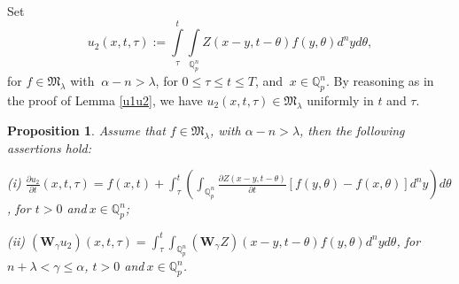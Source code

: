\documentclass{amsart}\usepackage{amsfonts}
\theoremstyle{plain}
\newtheorem{proposition}[theorem]{Proposition}
\numberwithin{equation}{section}
\begin{document}
Set
\[
u_{2}(x,t,\tau):={\displaystyle\int\limits_{\tau}^{t}}
\underset{\mathbb{Q}_{p}^{n}}{\int}Z(x-y,t-\theta)f(y,\theta)d^{n}yd\theta,
\]
for $f\in\mathcal{\mathfrak{M}}_{\lambda}$ with $\ \alpha-n>\lambda$, for
$0\leq\tau\leq t\leq T$, and $\ x\in\mathbb{Q}_{p}^{n}$. By reasoning as in
the proof of Lemma \ref{u1u2}, we have $u_{2}(x,t,\tau)\in
\mathcal{\mathfrak{M}}_{\lambda}$ uniformly in $t$ and $\tau$.

\begin{proposition}
\label{u2}Assume that $f\in\mathcal{\mathfrak{M}}_{\lambda}$, with
$\alpha-n>\lambda$, then the following assertions hold:

(i) $\frac{\partial u_{2}}{\partial t}(x,t,\tau)=f(x,t)+{\textstyle\int\nolimits_{\tau}^{t}}
\left(
{\textstyle\int\nolimits_{\mathbb{Q}_{p}^{n}}}
\frac{\partial Z(x-y,t-\theta)}{\partial t}\left[  f(y,\theta)-f(x,\theta
)\right]  d^{n}y\right)  d\theta$, for $t>0$ and$\ x\in\mathbb{Q}_{p}^{n}$;

(ii) $(\mathbf{W}_{\gamma}u_{2})(x,t,\tau)={\textstyle\int\nolimits_{\tau}^{t}}
{\textstyle\int\nolimits_{\mathbb{Q}_{p}^{n}}}
(\mathbf{W}_{\gamma}Z)(x-y,t-\theta)f(y,\theta)d^{n}yd\theta$, for
$n+\lambda<\gamma\leq\alpha$, $t>0$ and$\ x\in\mathbb{Q}_{p}^{n}$.
\end{proposition}
\end{document}
